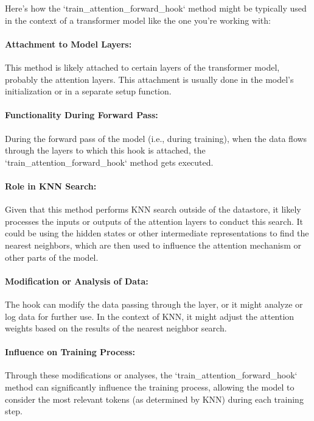 \documentclass[12pt]{article}
\begin{document}
Here's how the `train\_attention\_forward\_hook` method might be typically used
in the context of a transformer model like the one you're working with:

\paragraph{Attachment to Model Layers:} This method is likely attached to
certain layers of the transformer model, probably the attention layers. This
attachment is usually done in the model's initialization or in a separate setup
function.

\paragraph{Functionality During Forward Pass:} During the forward pass of the
model (i.e., during training), when the data flows through the layers to which
this hook is attached, the `train\_attention\_forward\_hook` method gets
executed.

\paragraph{Role in KNN Search:} Given that this method performs KNN search
outside of the datastore, it likely processes the inputs or outputs of the
attention layers to conduct this search. It could be using the hidden states or
other intermediate representations to find the nearest neighbors, which are
then used to influence the attention mechanism or other parts of the model.

\paragraph{Modification or Analysis of Data:} The hook can modify the data
passing through the layer, or it might analyze or log data for further use. In
the context of KNN, it might adjust the attention weights based on the results
of the nearest neighbor search.

\paragraph{Influence on Training Process:} Through these modifications or
analyses, the `train\_attention\_forward\_hook` method can significantly
influence the training process, allowing the model to consider the most
relevant tokens (as determined by KNN) during each training step.
\end{document}
